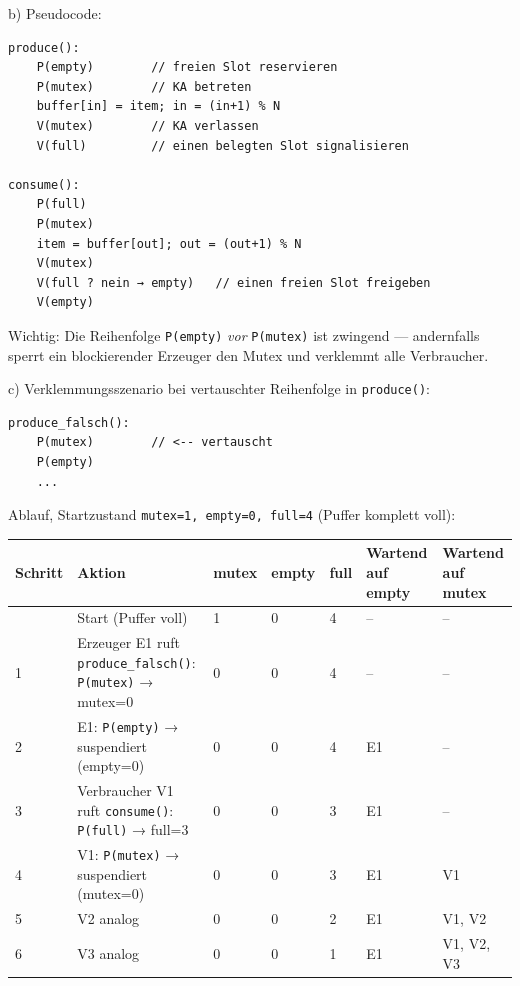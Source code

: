 \documentclass[11pt, a4paper]{article}
\begin{document}
b) Pseudocode:


\begin{lstlisting}
produce():
    P(empty)        // freien Slot reservieren
    P(mutex)        // KA betreten
    buffer[in] = item; in = (in+1) % N
    V(mutex)        // KA verlassen
    V(full)         // einen belegten Slot signalisieren

consume():
    P(full)
    P(mutex)
    item = buffer[out]; out = (out+1) % N
    V(mutex)
    V(full ? nein → empty)   // einen freien Slot freigeben
    V(empty)
\end{lstlisting}


Wichtig: Die Reihenfolge \texttt{P(empty)} \textit{vor} \texttt{P(mutex)} ist zwingend — andernfalls sperrt ein blockierender Erzeuger den Mutex und verklemmt alle Verbraucher.


c) Verklemmungsszenario bei vertauschter Reihenfolge in \texttt{produce()}:


\begin{lstlisting}
produce_falsch():
    P(mutex)        // <-- vertauscht
    P(empty)
    ...
\end{lstlisting}


Ablauf, Startzustand \texttt{mutex=1, empty=0, full=4} (Puffer komplett voll):



{\footnotesize
\begin{tabularx}{\linewidth}{XXXXXXX}
\hline
\rowcolor{tableheadbg}
{\color{white}\textbf{Schritt}} & {\color{white}\textbf{Aktion}} & {\color{white}\textbf{mutex}} & {\color{white}\textbf{empty}} & {\color{white}\textbf{full}} & {\color{white}\textbf{Wartend auf empty}} & {\color{white}\textbf{Wartend auf mutex}} \\[2pt]
\hline
\endhead
\hline
\endfoot
0 & Start (Puffer voll) & 1 & 0 & 4 & – & – \\
1 & Erzeuger E1 ruft \texttt{produce\_falsch()}: \texttt{P(mutex)} → mutex=0 & 0 & 0 & 4 & – & – \\
2 & E1: \texttt{P(empty)} → suspendiert (empty=0) & 0 & 0 & 4 & E1 & – \\
3 & Verbraucher V1 ruft \texttt{consume()}: \texttt{P(full)} → full=3 & 0 & 0 & 3 & E1 & – \\
4 & V1: \texttt{P(mutex)} → suspendiert (mutex=0) & 0 & 0 & 3 & E1 & V1 \\
5 & V2 analog & 0 & 0 & 2 & E1 & V1, V2 \\
6 & V3 analog & 0 & 0 & 1 & E1 & V1, V2, V3 \\
\end{tabularx}
}
\end{document}
